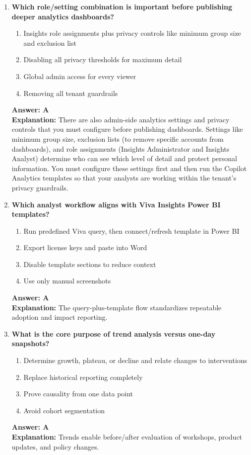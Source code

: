 \documentclass[10pt]{article}
\begin{document}
\begin{enumerate}[leftmargin=*]
\item \textbf{Which role/setting combination is important before publishing deeper analytics dashboards?}
\begin{enumerate}[label=\Alph*.]
  \item Insights role assignments plus privacy controls like minimum group size and exclusion list
  \item Disabling all privacy thresholds for maximum detail
  \item Global admin access for every viewer
  \item Removing all tenant guardrails
\end{enumerate}
\textbf{Answer: A}\\
\textbf{Explanation:} There are also admin-side analytics settings and privacy controls that you must configure before publishing dashboards. Settings like minimum group size, exclusion lists (to remove specific accounts from dashboards), and role assignments (Insights Administrator and Insights Analyst) determine who can see which level of detail and protect personal information. You must configure these settings first and then run the Copilot Analytics templates so that your analysts are working within the tenant’s privacy guardrails.

\item \textbf{Which analyst workflow aligns with Viva Insights Power BI templates?}
\begin{enumerate}[label=\Alph*.]
  \item Run predefined Viva query, then connect/refresh template in Power BI
  \item Export license keys and paste into Word
  \item Disable template sections to reduce context
  \item Use only manual screenshots
\end{enumerate}
\textbf{Answer: A}\\
\textbf{Explanation:} The query-plus-template flow standardizes repeatable adoption and impact reporting.

\item \textbf{What is the core purpose of trend analysis versus one-day snapshots?}
\begin{enumerate}[label=\Alph*.]
  \item Determine growth, plateau, or decline and relate changes to interventions
  \item Replace historical reporting completely
  \item Prove causality from one data point
  \item Avoid cohort segmentation
\end{enumerate}
\textbf{Answer: A}\\
\textbf{Explanation:} Trends enable before/after evaluation of workshops, product updates, and policy changes.


\end{enumerate}
\end{document}
